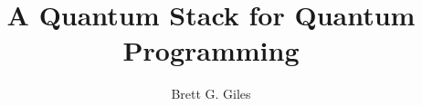 \documentclass[12pt]{report}
\begin{document}
\author{Brett G. Giles}
\title{A Quantum Stack for Quantum Programming}
\maketitle
\begin{abstract}

\end{abstract}
\tableofcontents{}
\listoftables
\listoffigures

\end{document}
